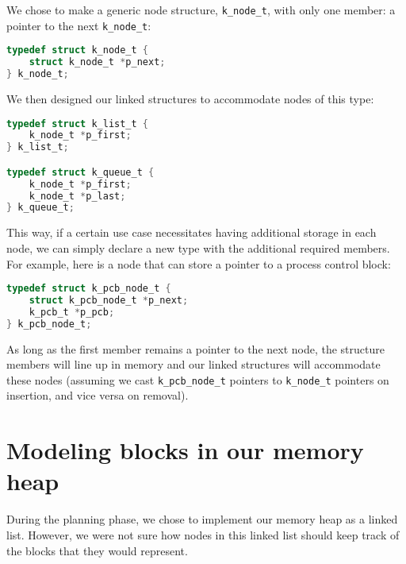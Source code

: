 \documentclass[12pt]{report}
\begin{document}
We chose to make a generic node structure, \texttt{k_node_t}, with only one member: a pointer to the next \texttt{k_node_t}:

\begin{minipage}{\textwidth}
\begin{lstlisting}[language=C]
typedef struct k_node_t {
    struct k_node_t *p_next;
} k_node_t;
\end{lstlisting}
\end{minipage}

We then designed our linked structures to accommodate nodes of this type:

\begin{minipage}{\textwidth}
\begin{lstlisting}[language=C]
typedef struct k_list_t {
    k_node_t *p_first;
} k_list_t;

typedef struct k_queue_t {
    k_node_t *p_first;
    k_node_t *p_last;
} k_queue_t;
\end{lstlisting}
\end{minipage}

This way, if a certain use case necessitates having additional storage in each node, we can simply declare a new type with the additional required members. For example, here is a node that can store a pointer to a process control block:

\begin{minipage}{\textwidth}
\begin{lstlisting}[language=C]
typedef struct k_pcb_node_t {
    struct k_pcb_node_t *p_next;
    k_pcb_t *p_pcb;
} k_pcb_node_t;
\end{lstlisting}
\end{minipage}

As long as the first member remains a pointer to the next node, the structure members will line up in memory and our linked structures will accommodate these nodes (assuming we cast \texttt{k_pcb_node_t} pointers to \texttt{k_node_t} pointers on insertion, and vice versa on removal).

\section{Modeling blocks in our memory heap}

During the planning phase, we chose to implement our memory heap as a linked list. However, we were not sure how nodes in this linked list should keep track of the blocks that they would represent.\\
\end{document}
